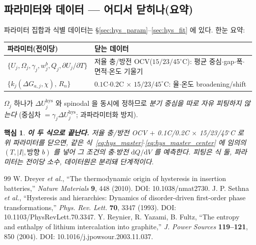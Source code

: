 \documentclass[11pt,a4paper]{article}
\newtheorem*{keybox}{핵심}
\newcommand{\dd}{\mathrm{d}}
\newcommand{\hys}{\mathrm{hys}}
\begin{document}
\subsection{파라미터와 데이터 — 어디서 닫히나(요약)}
파라미터 집합과 식별 데이터는 \S\ref{sec:hys_param}--\ref{sec:hys_fit} 에 있다. 한눈 요약:
\begin{center}
\renewcommand{\arraystretch}{1.3}
\begin{tabular}{p{} p{}}
\toprule
파라미터(전이당) & 닫는 데이터 \\
\midrule
$\{U_j,\Omega_j,\gamma_j,w_j^b,Q_j,\partial U_j/\partial T\}$ & 저율 충/방전 OCV($15/23/45^\circ$C): 평균 중심$\cdot$gap$\cdot$폭$\cdot$면적$\cdot$온도 기울기 \\
$\{k_j(\Delta G_{a,j},\chi),\,R_n\}$ & $0.1$C$\cdot$$0.2$C $\times$ $15/23/45^\circ$C: 율$\cdot$온도 broadening/shift \\
\bottomrule
\end{tabular}
\end{center}
$\Omega_j$ 하나가 $\Delta U_j^\hys$ 와 spinodal 을 동시에 정하므로 \emph{분기 중심을 따로 자유 피팅하지 않는다}
(중심차 $=\gamma_j\Delta U_j^\hys$; 과파라미터화 방지).
\begin{keybox}
\textbf{이 두 식으로 끝난다.} 저율 충/방전 OCV $+$ 0.1C/0.2C $\times$ 15/23/45$^\circ$C 로 위 파라미터를 닫으면,
같은 식~\eqref{eq:hys_master}$\cdot$\eqref{eq:hys_master_center} 에 임의의 $(T,|I|,\text{방향 }b)$ 를 넣어 그
조건의 충$\cdot$방전 $\dd Q/\dd V$ 를 \emph{예측}한다. 피팅은 식 둘, 파라미터는 전이당 소수, 데이터원은 분리돼
단계적이다.
\end{keybox}

\begin{thebibliography}{99}
 W. Dreyer \emph{et al.}, ``The thermodynamic origin of hysteresis in insertion batteries,'' \emph{Nature Materials} \textbf{9}, 448 (2010). DOI: 10.1038/nmat2730.
 J. P. Sethna \emph{et al.}, ``Hysteresis and hierarchies: Dynamics of disorder-driven first-order phase transformations,'' \emph{Phys. Rev. Lett.} \textbf{70}, 3347 (1993). DOI: 10.1103/PhysRevLett.70.3347.
 Y. Reynier, R. Yazami, B. Fultz, ``The entropy and enthalpy of lithium intercalation into graphite,'' \emph{J. Power Sources} \textbf{119--121}, 850 (2004). DOI: 10.1016/j.jpowsour.2003.11.037.
\end{thebibliography}
\end{document}
